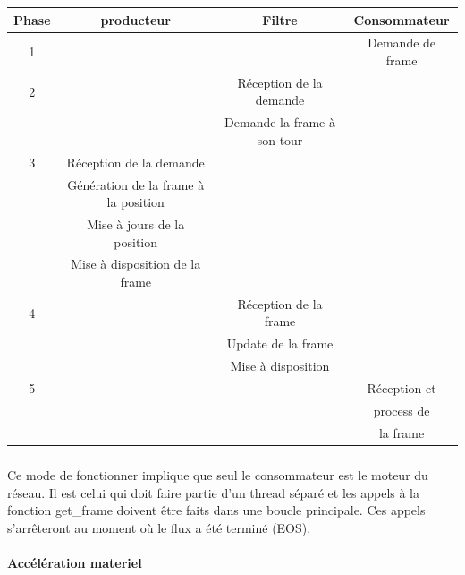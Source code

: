 \begin{center}

  \begin{tabular}{ | c | c | c | c |}

    \hline

Phase & producteur & Filtre & Consommateur    \\ \hline \hline

1 & & & Demande de frame \\ \hline

2 & & Réception de la demande & \\

  & & Demande la frame à son tour & \\ \hline

3 & Réception de la demande & & \\

  & Génération de la frame à la position & & \\

  & Mise à jours de la position & & \\

  & Mise à disposition de la frame & & \\ \hline

4 & & Réception de la frame       & \\

  & & Update de la frame & \\

  & & Mise à disposition & \\ \hline

5 & & & Réception et    \\

  & & & process de      \\

  & & & la frame        \\ \hline

  \end{tabular}

\end{center}

\subparagraph{}

Ce mode de fonctionner implique que seul le consommateur est le moteur
du réseau. Il est celui qui doit faire partie d'un thread séparé
et les appels à la fonction get\_frame doivent être faits dans une
boucle principale.  Ces appels s'arrêteront au moment où le flux a
été terminé (EOS).


\paragraph{Accélération materiel}

